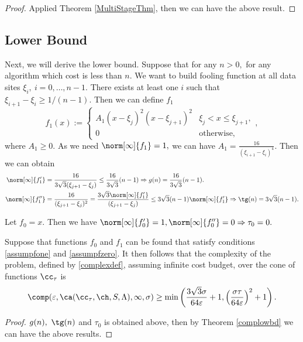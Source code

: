 \begin{proof}
Applied Theorem \ref{MultiStageThm}, then we can have the above result.
\end{proof}




\subsection{Lower Bound}
Next, we will derive the lower bound. Suppose that for any $n>0,$ for any algorithm which cost is less than $n.$
We want to build fooling function at all data sites $\xi_{i}, \ i=0,\ldots,n-1.$
There exists at least one $i$ such that $\xi_{i+1}-\xi_{i}\ge 1/(n-1).$
Then we can define $f_{1}$
$$f_{1}(x):=\left\{\begin{matrix}
A_{1}(x-\xi_{j})^{2}(x-\xi_{j+1})^{2} & \xi_{j}< x \leq \xi_{j+1},\\
0 & \text{otherwise},
\end{matrix}\right.,$$
where $A_{1} \ge 0.$ As we need $\norm[\infty]{f_1}=1,$ we can have $A_{1}=\frac{16}{(\xi_{i+1}-\xi_{i})^4}.$
Then we can obtain
\begin{align*}
\norm[\infty]{f'_1}&=\frac{16}{3\sqrt{3}(\xi_{j+1}-\xi_{j})}\leq \frac{16}{3\sqrt{3}}(n-1) \Rightarrow g(n)=\frac{16}{3\sqrt{3}}(n-1).\\
\norm[\infty]{f''_1}&=\frac{16}{(\xi_{j+1}-\xi_{j})^2}
=\frac{3\sqrt{3}\norm[\infty]{f'_1}}{(\xi_{j+1}-\xi_{j})}
 \leq 3\sqrt{3}(n-1)\norm[\infty]{f'_1}\Rightarrow \tg(n)=3\sqrt{3}(n-1).
\end{align*}

Let $f_0=x.$ Then we have $\norm[\infty]{f'_0}=1, \norm[\infty]{f''_0}=0 \Rightarrow \tau_0=0.$

\begin{theorem} \label{complowbdappr} Suppose that functions $f_{0}$ and $f_1$ can be found that satisfy conditions \eqref{assumpfone} and \eqref{assumpfzero}.  It then follows that the complexity of the problem, defined by \eqref{complexdef}, assuming infinite cost budget, over the cone of functions $\cc_{\tau}$ is
$$
\comp(\varepsilon,\ca(\cc_{\tau},\ch,S,\Lambda),\infty,\sigma)
\ge \min\left(\frac{3\sqrt{3}\sigma}{64 \varepsilon}+1, \left(\frac{\sigma\tau}{64\varepsilon}\right)^{2}+1 \right).
$$
\end{theorem}

\begin{proof}
$g(n), \ \tg(n)$ and $\tau_0$ is obtained above, then by Theorem \ref{complowbd}
we can have the above results.
\end{proof}

